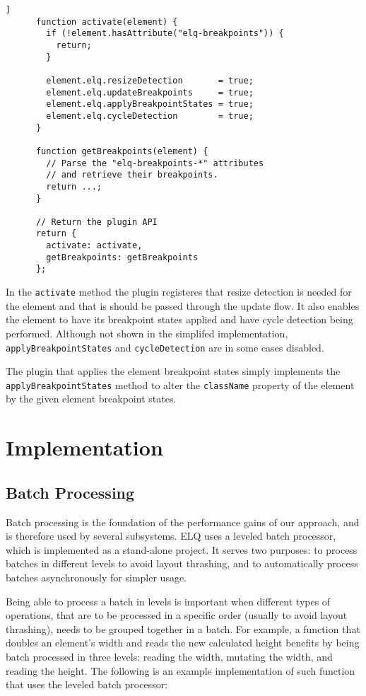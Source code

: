 \documentclass{acm_proc_article-sp}
\newcommand{\code}[1]{\texttt{#1}}
\newcommand{\elq}{ELQ}
\begin{document}
    \begin{lstlisting}[gobble=6,caption={},captionpos=b,label={}]]
      function activate(element) {
        if (!element.hasAttribute("elq-breakpoints")) {
          return;
        }

        element.elq.resizeDetection       = true;
        element.elq.updateBreakpoints     = true;
        element.elq.applyBreakpointStates = true;
        element.elq.cycleDetection        = true;
      }

      function getBreakpoints(element) {
        // Parse the "elq-breakpoints-*" attributes
        // and retrieve their breakpoints.
        return ...;
      }

      // Return the plugin API
      return {
        activate: activate,
        getBreakpoints: getBreakpoints
      };
    \end{lstlisting}

    In the \code{activate} method the plugin registeres that resize detection is needed for the element and that is should be passed through the update flow.
    It also enables the element to have its breakpoint states applied and have cycle detection being performed.
    Although not shown in the simplifed implementation, \code{applyBreakpointStates} and \code{cycleDetection} are in some cases disabled.

    The plugin that applies the element breakpoint states simply implements the \code{applyBreakpointStates} method to alter the \code{className} property of the element by the given element breakpoint states.

\section{Implementation}\label{sec:imp}
  \subsection{Batch Processing}\label{sec:imp_batch_processor}
    Batch processing is the foundation of the performance gains of our approach, and is therefore used by several subsystems.
    \elq{} uses a leveled batch processor, which is implemented as a stand-alone project.
    It serves two purposes: to process batches in different levels to avoid layout thrashing, and to automatically process batches asynchronously for simpler usage.

    Being able to process a batch in levels is important when different types of operations, that are to be processed in a specific order (usually to avoid layout thrashing), needs to be grouped together in a batch.
    For example, a function that doubles an element's width and reads the new calculated height benefits by being batch processed in three levels: reading the width, mutating the width, and reading the height.
    The following is an example implementation of such function that uses the leveled batch processor:
\end{document}
